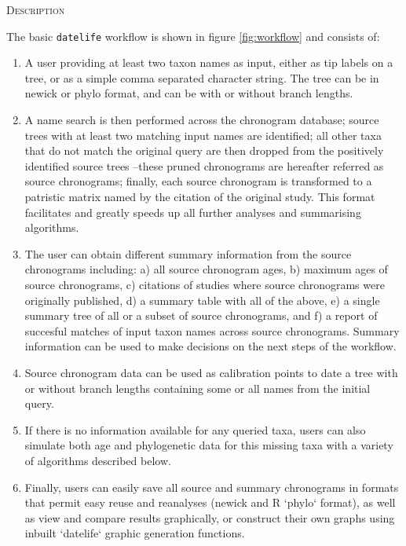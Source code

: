 \documentclass[]{article}
\begin{document}
\begin{center}
\textsc{Description}
\end{center}

The basic \texttt{datelife} workflow is shown in figure \ref{fig:workflow} and consists of:

\begin{enumerate}
\item A user providing at least two taxon names as input, either as tip labels on a tree, or as a simple comma separated character string. The tree can be in newick or phylo format, and can be with or without branch lengths.
\item A name search is then performed across the chronogram database; source trees with at least two matching input names are identified; all other taxa that do not match the original query are then dropped from the positively identified source trees --these pruned chronograms are hereafter referred as source chronograms; finally, each source chronogram is transformed to a patristic matrix named by the citation of the original study. This format facilitates and greatly speeds up all further analyses and summarising algorithms.
\item  The user can obtain different summary information from the source chronograms including: a) all source chronogram ages, b) maximum ages of source chronograms, c) citations of studies where source chronograms were originally published, d) a summary table with all of the above, e) a single summary tree of all or a subset of source chronograms, and f) a report of succesful matches of input taxon names across source chronograms. Summary information can be used to make decisions on the next steps of the workflow. 
\item  Source chronogram data can be used as calibration points to date a tree with or without branch lengths containing some or all names from the initial query. %
\item  If there is no information available for any queried taxa, users can also simulate both age and phylogenetic data for this missing taxa with a variety of algorithms described below.
\item  Finally, users can easily save all source and summary chronograms in formats that permit easy reuse and reanalyses (newick and R `phylo` format), as well as view and compare results graphically, or construct their own graphs using inbuilt `datelife` graphic generation functions.
\end{enumerate}
\end{document}
